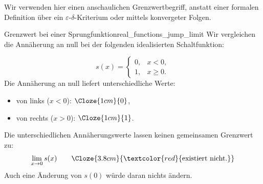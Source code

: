 Wir verwenden hier einen anschaulichen Grenzwertbegriff, anstatt einer formalen Definition
über ein $\varepsilon$-$\delta$-Kriterium oder mittels konvergeter Folgen.

\begin{ExampleBox}{Grenzwert bei einer Sprungfunktion}{real_functions_jump_limit}
  Wir vergleichen die Annäherung an null bei der folgenden idealisierten
  Schaltfunktion:
  \par\smallskip
  \begin{minipage}[c]{0.47\linewidth}
    \[
      s(x)=\begin{cases}0,&x<0,\\1,&x\ge0.\end{cases}
    \]
    Die Annäherung an null liefert unterschiedliche Werte:
    \begin{itemize}
      \item von links ($x<0$): $\Cloze{1cm}{0}$,
      \item von rechts ($x>0$): $\Cloze{1cm}{1}$.
    \end{itemize}
  \end{minipage}\hfill
  \begin{minipage}[c]{0.49\linewidth}
    \centering
  \end{minipage}
  \par\medskip
  Die unterschiedlichen Annäherungswerte lassen keinen gemeinsamen
  Grenzwert zu:
  \[
    \lim_{x\to0}s(x)\qquad
    \Cloze{3.8cm}{\textcolor{red}{\text{existiert nicht.}}}
  \]
  Auch eine Änderung von $s(0)$ würde daran nichts ändern.
\end{ExampleBox}


